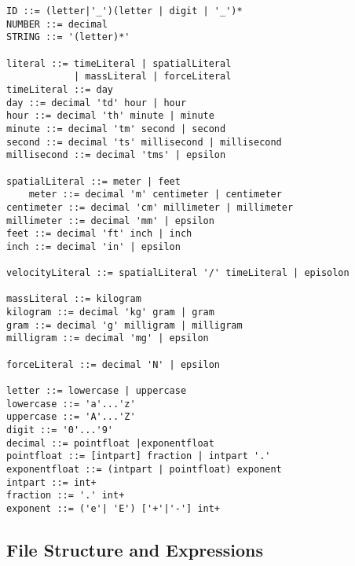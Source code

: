 \documentclass[letterpaper]{article}
\begin{document}
\begin{verbatim}
ID ::= (letter|'_')(letter | digit | '_')*
NUMBER ::= decimal
STRING ::= '(letter)*'

literal ::= timeLiteral | spatialLiteral 
            | massLiteral | forceLiteral
timeLiteral ::= day
day ::= decimal 'td' hour | hour
hour ::= decimal 'th' minute | minute
minute ::= decimal 'tm' second | second
second ::= decimal 'ts' millisecond | millisecond 
millisecond ::= decimal 'tms' | epsilon

spatialLiteral ::= meter | feet
	meter ::= decimal 'm' centimeter | centimeter
centimeter ::= decimal 'cm' millimeter | millimeter
millimeter ::= decimal 'mm' | epsilon
feet ::= decimal 'ft' inch | inch
inch ::= decimal 'in' | epsilon

velocityLiteral ::= spatialLiteral '/' timeLiteral | episolon

massLiteral ::= kilogram
kilogram ::= decimal 'kg' gram | gram
gram ::= decimal 'g' milligram | milligram
milligram ::= decimal 'mg' | epsilon

forceLiteral ::= decimal 'N' | epsilon

letter ::= lowercase | uppercase
lowercase ::= 'a'...'z'
uppercase ::= 'A'...'Z'
digit ::= '0'...'9'
decimal ::= pointfloat |exponentfloat
pointfloat ::= [intpart] fraction | intpart '.'
exponentfloat ::= (intpart | pointfloat) exponent
intpart ::= int+
fraction ::= '.' int+
exponent ::= ('e'| 'E') ['+'|'‐'] int+
\end{verbatim}

\subsection{File Structure and Expressions}
\end{document}
